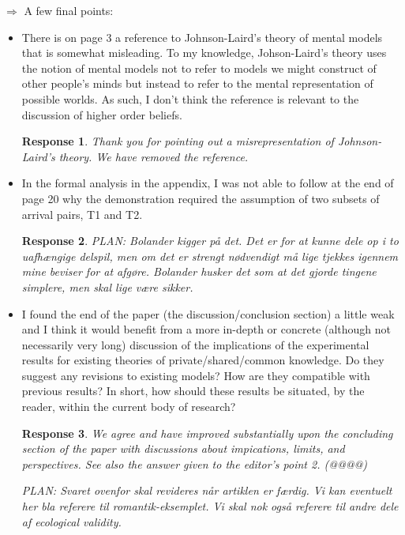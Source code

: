 \documentclass[a4paper]{article}
\newtheorem{response}{Response}
\begin{document}
$\Rightarrow$ A few final points:
\begin{itemize}
\item  There is on page 3 a reference to Johnson-Laird's theory of mental models that is somewhat misleading. To my knowledge, Johson-Laird's theory uses the notion of mental models not to refer to models we might construct of other people's minds but instead to refer to the mental representation of possible worlds. As such, I don't think the reference is relevant to the discussion of higher order beliefs.

\begin{response} Thank you for pointing out a misrepresentation of Johnson-Laird's theory. We have removed the reference.\end{response}
 
\item In the formal analysis in the appendix, I was not able to follow at the end of page 20 why the demonstration required the assumption of two subsets of arrival pairs, T1 and T2.

\begin{response}
PLAN: Bolander kigger på det. Det er for at kunne dele op i to uafhængige delspil, men om det er strengt nødvendigt må lige tjekkes igennem mine beviser for at afgøre. Bolander husker det som at det gjorde tingene simplere, men skal lige være sikker. 
\end{response} 



\item I found the end of the paper (the discussion/conclusion section) a little weak and I think it would benefit from a more in-depth or concrete (although not necessarily very long) discussion of the implications of the experimental results for existing theories of private/shared/common knowledge. Do they suggest any revisions to existing models? How are they compatible with previous results? In short, how should these results be situated, by the reader, within the current body of research?

\begin{response} 
We agree and have improved substantially upon the concluding section of the paper with discussions about impications, limits, and perspectives. See also the answer given to the editor's point 2. (@@@@) 

PLAN: Svaret ovenfor skal revideres når artiklen er færdig. Vi kan eventuelt her bla referere til romantik-eksemplet. Vi skal nok også referere til andre dele af ecological validity.
\end{response}
\end{itemize}
\end{document}
